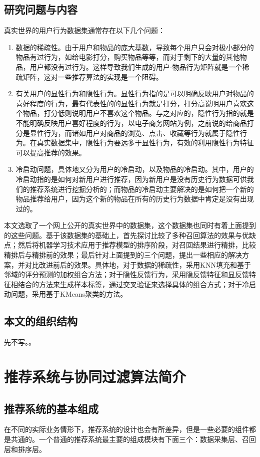 \documentclass{article}
\begin{document}
	\subsection{研究问题与内容}
	真实世界的用户行为数据集通常存在以下几个问题：
	\begin{enumerate}
		\item 数据的稀疏性。由于用户和物品的庞大基数，导致每个用户只会对极小部分的物品有过行为，如给电影打分，购买物品等等，而对于剩下的大量的其他物品，用户都没有过行为。这样导致我们生成的用户-物品行为矩阵就是一个稀疏矩阵，这对一些推荐算法的实现是一个阻碍。
		\item 有关用户的显性行为和隐性行为。显性行为指的是可以明确反映用户对物品的喜好程度的行为，最有代表性的的显性行为就是打分，打分高说明用户喜欢这个物品，打分低则说明用户不喜欢这个物品。与之对应的，隐性行为指的就是不能明确反映用户喜好程度的行为，以电子商务网站为例，之前说的给商品打分是显性行为，而诸如用户对商品的浏览、点击、收藏等行为就属于隐性行为。在真实数据集中，隐性行为要远多于显性行为，有效的利用隐性行为特征可以提高推荐的效果。
		\item 冷启动问题，具体地又分为用户的冷启动，以及物品的冷启动。其中，用户的冷启动指的是如何对新用户进行推荐，因为新用户是没有历史行为数据可供我们的推荐系统进行挖掘分析的；而物品的冷启动主要解决的是如何把一个新的物品推荐给用户，因为这个新的物品在所有的历史行为数据中肯定是没有出现过的。
	\end{enumerate}

	本文选取了一个网上公开的真实世界中的数据集，这个数据集也同时有着上面提到的这些问题。基于该数据集的基础上，首先探讨比较了多种召回算法的效果与优缺点；然后将机器学习技术应用于推荐模型的排序阶段，对召回结果进行精排，比较精排后与精排前的效果；最后针对上面提到的三个问题，提出一些相应的解决方案，并对比改进前后的效果。具体地，对于数据的稀疏性，采用KNN填充和基于邻域的评分预测的加权组合方法；对于隐性反馈行为，采用隐反馈特征和显反馈特征相结合的方法来生成样本标签，通过交叉验证来选择具体的组合方式；对于冷启动问题，采用基于KMeans聚类的方法。

	\subsection{本文的组织结构}
	先不写。。

\section{推荐系统与协同过滤算法简介}
	\subsection{推荐系统的基本组成}
	在不同的实际业务情形下，推荐系统的设计也会有所差异，但是一些必要的组件都是共通的。一个普通的推荐系统最主要的组成模块有下面三个：数据采集层、召回层和排序层。
\end{document}

